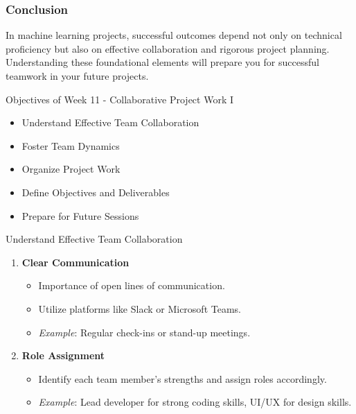 \documentclass[aspectratio=169]{beamer}
\begin{document}
\begin{frame}[fragile]
    \frametitle{Conclusion}
    
    In machine learning projects, successful outcomes depend not only on technical proficiency but also on effective collaboration and rigorous project planning. Understanding these foundational elements will prepare you for successful teamwork in your future projects.
\end{frame}

\begin{frame}[fragile]{Objectives of Week 11 - Collaborative Project Work I}
    \begin{itemize}
        \item Understand Effective Team Collaboration
        \item Foster Team Dynamics
        \item Organize Project Work
        \item Define Objectives and Deliverables
        \item Prepare for Future Sessions
    \end{itemize}
\end{frame}

\begin{frame}[fragile]{Understand Effective Team Collaboration}
    \begin{enumerate}
        \item \textbf{Clear Communication}
            \begin{itemize}
                \item Importance of open lines of communication.
                \item Utilize platforms like Slack or Microsoft Teams.
                \item \textit{Example}: Regular check-ins or stand-up meetings.
            \end{itemize}
        
        \item \textbf{Role Assignment}
            \begin{itemize}
                \item Identify each team member’s strengths and assign roles accordingly.
                \item \textit{Example}: Lead developer for strong coding skills, UI/UX for design skills.
            \end{itemize}
    \end{enumerate}
\end{frame}
\end{document}
